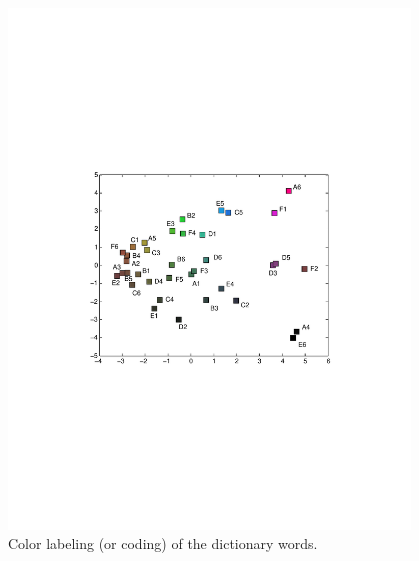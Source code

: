 \begin{frame}
\begin{columns}
\begin{column}{.5\textwidth}
\end{column}
\begin{column}{.5\textwidth}
\vspace{7pt}
\begin{figure}[htbp]
\setlength{\abovecaptionskip}{2pt}
\centering
\includegraphics[trim = 125 250 120 250, clip,height=.4\textheight]{siftTexture/clusterDistances2.pdf}
\caption{ Color labeling (or coding) of the dictionary words.}
\end{figure}\end{column}
\end{columns}


\end{frame}

